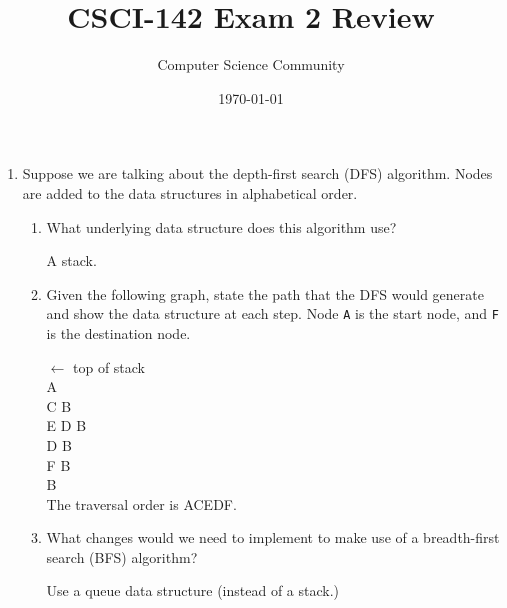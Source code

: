 \documentclass[11pt]{article}
\title{CSCI-142 Exam 2 Review}
\author{Computer Science Community}
\date{\today}
\newenvironment{answer}{\large\lstset{basicstyle=\tiny\ttfamily}\color{white} }{}
\newenvironment{answer}{\large\lstset{basicstyle=\large\ttfamily}\color{red} }{}
\begin{document}
\header
\begin{enumerate}


\item Suppose we are talking about the depth-first search (DFS) algorithm.  Nodes are added to the data structures in alphabetical order.
\begin{enumerate}
\item What underlying data structure does this algorithm use?

\begin{answer}
A stack.
\end{answer}

\item %
Given the following graph, state the path that the DFS would generate and show the data structure at each step.
Node \texttt{A} is the start node, and \texttt{F} is the destination node.

\begin{minipage}{0.35\textwidth}
\vspace{-136pt}
\begin{answer}
$\leftarrow$ top of stack \\
A \\
C B \\
E D B \\
D B \\
F B \\
B \\

The traversal order is ACEDF.
\end{answer}
\end{minipage}

\item %
What changes would we need to implement to make use of a breadth-first search (BFS) algorithm?

\begin{answer}
Use a queue data structure (instead of a stack.)
\end{answer}
\end{enumerate}



\end{enumerate}
\end{document}
